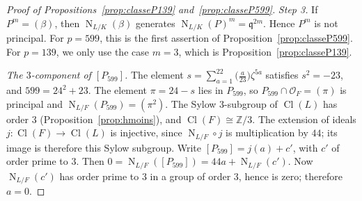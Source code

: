 \documentclass[11pt,a4paper]{amsart}
\theoremstyle{plain}
\theoremstyle{definition}
\numberwithin{equation}{section}
\newcommand{\Z}{\mathbb{Z}}
\newcommand{\OO}{\mathcal{O}}
\newcommand{\q}{\mathfrak{q}}
\DeclareMathOperator{\Nm}{N}
\DeclareMathOperator{\Cl}{Cl}
\begin{document}
\begin{proof}[Proof of Propositions~\ref{prop:classeP139} and~\ref{prop:classeP599}]
\emph{Step 3.} If $P^m=(\beta)$, then $\Nm_{L/K}(\beta)$ generates $\Nm_{L/K}(P)^m=\q^{2m}$. Hence $P^m$ is not principal. For $p=599$, this is the first assertion of Proposition~\ref{prop:classeP599}. For $p=139$, we only use the case $m=3$, which is Proposition~\ref{prop:classeP139}.

\emph{The $3$-component of $[P_{599}]$.} The element $s=\sum_{a=1}^{22}\bigl(\frac a{23}\bigr)\zeta^{5a}$ satisfies $s^2=-23$, and $599=24^2+23$. The element $\pi=24-s$ lies in $P_{599}$, so $P_{599}\cap\OO_F=(\pi)$ is principal and $\Nm_{L/F}(P_{599})=(\pi^2)$. The Sylow $3$-subgroup of $\Cl(L)$ has order $3$ (Proposition~\ref{prop:hmoins}), and $\Cl(F)\cong\Z/3$. The extension of ideals $j\colon\Cl(F)\to\Cl(L)$ is injective, since $\Nm_{L/F}\circ j$ is multiplication by $44$; its image is therefore this Sylow subgroup. Write $[P_{599}]=j(a)+c'$, with $c'$ of order prime to $3$. Then $0=\Nm_{L/F}([P_{599}])=44a+\Nm_{L/F}(c')$. Now $\Nm_{L/F}(c')$ has order prime to $3$ in a group of order $3$, hence is zero; therefore $a=0$.
\end{proof}
\end{document}
